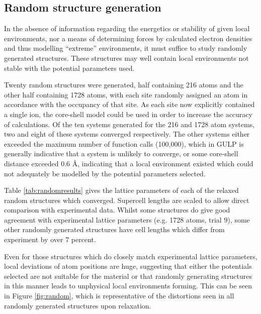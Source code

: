 \subsection{Random structure generation}
In the absence of information regarding the energetics or stability of given local environments, nor a means of determining forces by calculated electron densities and thus modelling ``extreme'' environments, it must suffice to study randomly generated structures.
These structures may well contain local environments not stable with the potential parameters used.

Twenty random structures were generated, half containing 216 atoms and the other half containing 1728 atoms, with each site randomly assigned an atom in accordance with the occupancy of that site.
As each site now explicitly contained a single ion, the core-shell model could be used in order to increase the accuracy of calculations.
Of the ten systems generated for the 216 and 1728 atom systems, two and eight of these systems converged respectively.
The other systems either exceeded the maximum number of function calls (100,000), which in GULP is generally indicative that a system is unlikely to converge, or some core-shell distance exceeded 0.6 \AA, indicating that a local environment existed which could not adequately be modelled by the potential parameters selected.

Table \ref{tab:randomresults} gives the lattice parameters of each of the relaxed random structures which converged.
Supercell lengths are scaled to allow direct comparison with experimental data.\cite{Freire2016}
Whilst some structures do give good agreement with experimental lattice parameters (e.g. 1728 atoms, trial 9), some other randomly generated structures have cell lengths which differ from experiment by over 7 percent.

Even for those structures which do closely match experimental lattice parameters, local deviations of atom positions are huge, suggesting that either the potentials selected are not suitable for the material or that randomly generating structures in this manner leads to unphysical local environments forming. This can be seen in Figure \ref{fig:random}, which is representative of the distortions seen in all randomly generated structures upon relaxation.

